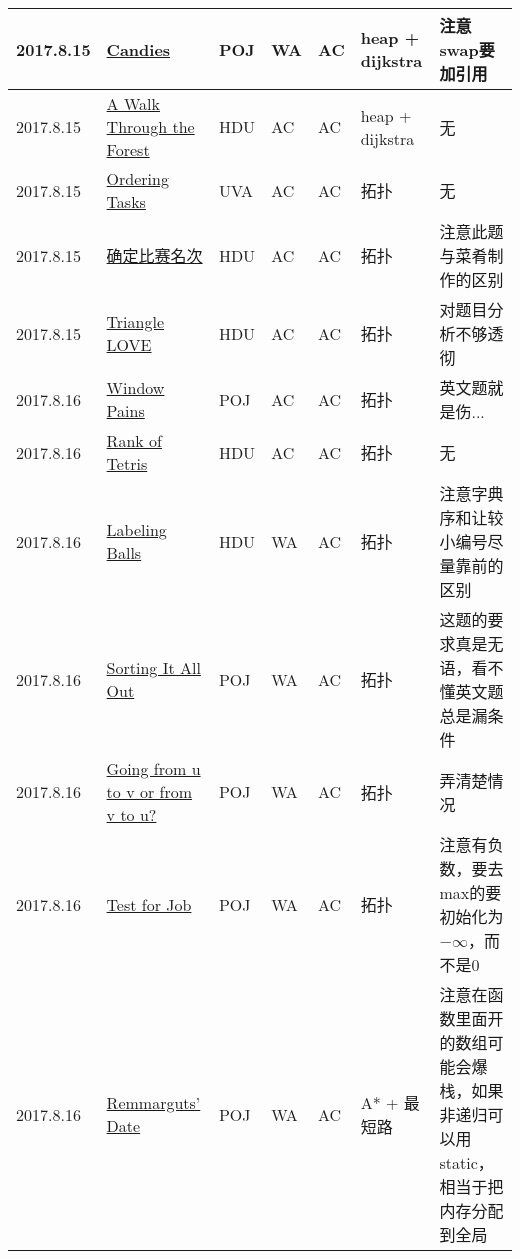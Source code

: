 \documentclass[a4paper]{article}
\begin{document}
\begin{longtable}{|p{1.5cm}|p{2.5cm}|p{1.6cm}|p{1.6cm}|p{1cm}|p{3cm}|p{4cm}|}
		\hline
		2017.8.15 & \href {https://cn.vjudge.net/problem/POJ-3159}{Candies}
		 & POJ & WA & AC & heap + dijkstra & 注意swap要加引用\\
		
		\hline
		2017.8.15 & \href {https://vjudge.net/problem/HDU-1142}{A Walk Through the Forest}
		 & HDU & AC & AC & heap + dijkstra & 无\\
		
		\hline
		2017.8.15 & \href {https://vjudge.net/problem/UVA-10305}{Ordering Tasks}
		 & UVA & AC & AC & 拓扑 & 无\\
		
		\hline
		2017.8.15 & \href {https://vjudge.net/problem/HDU-1285}{确定比赛名次}
		 & HDU & AC & AC & 拓扑 & 注意此题与菜肴制作的区别\\
		
		\hline
		2017.8.15 & \href {https://vjudge.net/problem/HDU-4324}{Triangle LOVE}
		 & HDU & AC & AC & 拓扑 & 对题目分析不够透彻\\
		
		\hline
		2017.8.16 & \href {https://cn.vjudge.net/problem/POJ-2585}{Window Pains}
		 & POJ & AC & AC & 拓扑 & 英文题就是伤...\\
		
		\hline
		2017.8.16 & \href {https://cn.vjudge.net/problem/HDU-1811}{Rank of Tetris}
		 & HDU & AC & AC & 拓扑 & 无\\
		
		\hline
		2017.8.16 & \href {https://cn.vjudge.net/problem/POJ-3687}{Labeling Balls}
		 & HDU & WA & AC & 拓扑 & 注意字典序和让较小编号尽量靠前的区别\\
		
		\hline
		2017.8.16 & \href {https://cn.vjudge.net/problem/POJ-1094}{Sorting It All Out}
		 & POJ & WA & AC & 拓扑 & 这题的要求真是无语，看不懂英文题总是漏条件\\
		
		\hline
		2017.8.16 & \href {https://cn.vjudge.net/problem/POJ-2762}{Going from u to v or from v to u?}
		 & POJ & WA & AC & 拓扑 & 弄清楚情况\\
		
		\hline
		2017.8.16 & \href {https://cn.vjudge.net/problem/POJ-3249}{Test for Job}
		 & POJ & WA & AC & 拓扑 & 注意有负数，要去max的要初始化为$-\infty$，而不是0\\
		
		\hline
		2017.8.16 & \href {https://cn.vjudge.net/problem/POJ-2449}{Remmarguts' Date}
		 & POJ & WA & AC & A* + 最短路 & 注意在函数里面开的数组可能会爆栈，如果非递归可以用static，相当于把内存分配到全局\\
		

\end{longtable}
\end{document}
